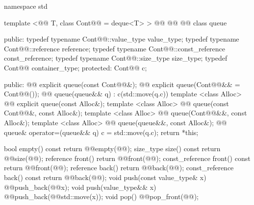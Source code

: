 \documentclass[american,twoside]{book}
\begin{document}
\begin{codeblock}
namespace std {
  template <@@ T, class Cont@@ = deque<T> >
  @@
        @@
        @@
  class queue {
  public:
    typedef typename Cont@@::value_type            value_type;
    typedef typename Cont@@::reference             reference;
    typedef typename Cont@@::const_reference       const_reference;
    typedef typename Cont@@::size_type             size_type;
    typedef          Cont@@                        container_type;
  protected:
    Cont@@ c;

  public:
    @@ explicit queue(const Cont@@&);
    @@ explicit queue(Cont@@&& = Cont@@());
    @@ queue(queue&& q) : c(std::move(q.c)) {}
    template <class Alloc> 
      @@
      explicit queue(const Alloc&);
    template <class Alloc> 
      @@
      queue(const Cont@@&, const Alloc&);
    template <class Alloc> 
      @@
      queue(Cont@@&&, const Alloc&);
    template <class Alloc> 
      @@
      queue(queue&&, const Alloc&);
    @@ queue& operator=(queue&& q)
                                        { c = std::move(q.c); return *this; }

    bool              empty() const     { return @@empty(@@); }
    size_type         size()  const     { return @@size(@@); }
    reference         front()           { return @@front(@@); }
    const_reference   front() const     { return @@front(@@); }
    reference         back()            { return @@back(@@); }
    const_reference   back() const      { return @@back(@@); }
    void push(const value_type& x)      { @@push_back(@@x); }
    void push(value_type&& x)           { @@push_back(@@std::move(x)); }
    void pop()                          { @@pop_front(@@); }
    
}}
\end{codeblock}
\end{document}
